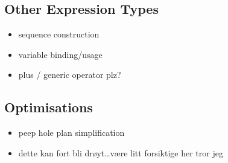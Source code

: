 \subsection{Other Expression Types}
\label{sect:translation:llOtherExpr}
\begin{itemize}
  \item sequence construction
  \item variable binding/usage
  \item plus / generic operator plz?
\end{itemize}

\subsection{Optimisations}
\label{sect:translation:llOptimisations}
\begin{itemize}
  \item peep hole plan simplification
  \item dette kan fort bli dr\o yt\ldots v\ae re litt forsiktige her tror jeg
\end{itemize}

